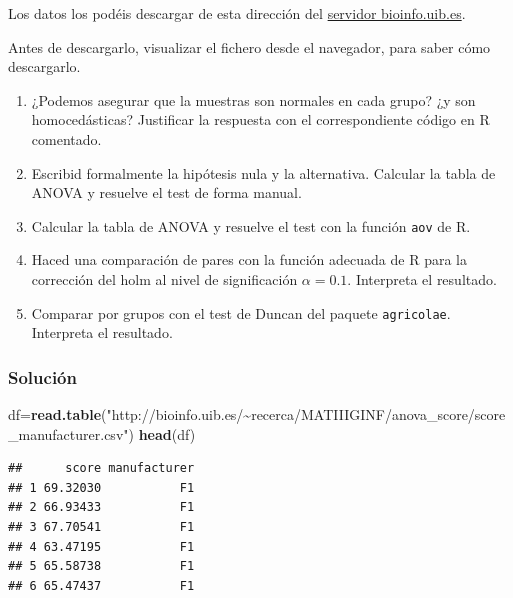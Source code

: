 \documentclass[
]{article}
\newenvironment{Shaded}{\begin{snugshade}}{\end{snugshade}}
\newcommand{\KeywordTok}[1]{\textcolor[rgb]{0.13,0.29,0.53}{\textbf{#1}}}
\newcommand{\NormalTok}[1]{#1}
\newcommand{\OperatorTok}[1]{\textcolor[rgb]{0.81,0.36,0.00}{\textbf{#1}}}
\newcommand{\StringTok}[1]{\textcolor[rgb]{0.31,0.60,0.02}{#1}}
\providecommand{\tightlist}{%
  \setlength{\itemsep}{0pt}\setlength{\parskip}{0pt}}
\begin{document}
Los datos los podéis descargar de esta dirección del
\href{http://bioinfo.uib.es/~recerca/MATIIIGINF/anova_score/}{servidor
bioinfo.uib.es}.

Antes de descargarlo, visualizar el fichero desde el navegador, para
saber cómo descargarlo.

\begin{enumerate}
\def\labelenumi{\arabic{enumi}.}
\tightlist
\item
  ¿Podemos asegurar que la muestras son normales en cada grupo? ¿y son
  homocedásticas? Justificar la respuesta con el correspondiente código
  en R comentado.
\item
  Escribid formalmente la hipótesis nula y la alternativa. Calcular la
  tabla de ANOVA y resuelve el test de forma manual.
\item
  Calcular la tabla de ANOVA y resuelve el test con la función
  \texttt{aov} de R.
\item
  Haced una comparación de pares con la función adecuada de R para la
  corrección del holm al nivel de significación \(\alpha=0.1\).
  Interpreta el resultado.
\item
  Comparar por grupos con el test de Duncan del paquete
  \texttt{agricolae}. Interpreta el resultado.
\end{enumerate}

\hypertarget{soluciuxf3n-9}{%
\subsubsection{Solución}\label{soluciuxf3n-9}}

\begin{Shaded}
\begin{Highlighting}[]
\NormalTok{df=}\KeywordTok{read.table}\NormalTok{(}\StringTok{"http://bioinfo.uib.es/\textasciitilde{}recerca/MATIIIGINF/anova\_score/score\_manufacturer.csv"}\NormalTok{)}
\KeywordTok{head}\NormalTok{(df)}
\end{Highlighting}
\end{Shaded}

\begin{verbatim}
##      score manufacturer
## 1 69.32030           F1
## 2 66.93433           F1
## 3 67.70541           F1
## 4 63.47195           F1
## 5 65.58738           F1
## 6 65.47437           F1
\end{verbatim}

\begin{Shaded}
\end{Shaded}
\end{document}
